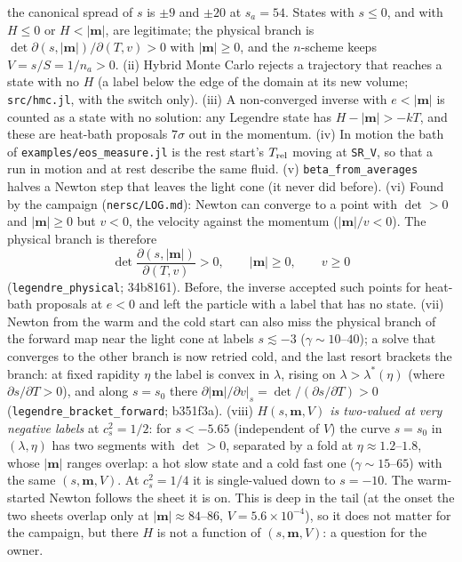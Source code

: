 \documentclass[11pt,aps,preprint,nofootinbib,superscriptaddress,tightenlines]{revtex4-2}
\def\st{\begin{equation}}
\def\stp{\end{equation}}
\begin{document}
\begin{itemize}
  the canonical spread of $s$ is $\pm9$ and $\pm20$ at $s_a=54$.  States with $s\le0$, and with $H\le0$ or $H<|\bm m|$, are legitimate; the physical branch is
  $\det\partial(s,|\bm m|)/\partial(T,v)>0$ with $|\bm m|\ge0$, and the $n$-scheme keeps $V=s/S=1/n_a>0$.  (ii) Hybrid Monte Carlo rejects a trajectory that
  reaches a state with no $H$ (a label below the edge of the domain at its new volume; \nolinkurl{src/hmc.jl}, with the switch only).  (iii) A non-converged
  inverse with $e<|\bm m|$ is counted as a state with no solution: any Legendre state has $H-|\bm m|>-kT$, and these are heat-bath proposals $7\sigma$ out in
  the momentum.  (iv) In motion the bath of \nolinkurl{examples/eos_measure.jl} is the rest start's $T_{\rm rel}$ moving at \texttt{SR\_V}, so that a run in motion
  and at rest describe the same fluid.  (v) \texttt{beta\_from\_averages} halves a Newton step that leaves the light cone (it never did before).
  (vi) Found by the campaign (\nolinkurl{nersc/LOG.md}): Newton can converge to a point with $\det>0$ and $|\bm m|\ge0$ but $v<0$, the velocity against
  the momentum ($|\bm m|/v<0$).  The physical branch is therefore
  \st
  \det\frac{\partial(s,|\bm m|)}{\partial(T,v)}>0,\qquad |\bm m|\ge0,\qquad v\ge0
  \stp
  (\texttt{legendre\_physical}; 34b8161).  Before, the inverse accepted such points for heat-bath proposals at $e<0$ and left the particle with a label
  that has no state.  (vii) Newton from the warm and the cold start can also miss the physical branch of the forward map near the light cone at
  labels $s\lesssim-3$ ($\gamma\sim10$--$40$); a solve that converges to the other branch is now retried cold, and the last resort brackets the
  branch: at fixed rapidity $\eta$ the label is convex in $\lambda$, rising on $\lambda>\lambda^*(\eta)$ (where $\partial s/\partial T>0$), and along
  $s=s_0$ there $\partial|\bm m|/\partial v|_s=\det/(\partial s/\partial T)>0$ (\texttt{legendre\_bracket\_forward}; b351f3a).
  (viii) \emph{$H(s,\bm m,V)$ is two-valued at very negative labels} at $c_s^2=1/2$: for $s<-5.65$ (independent of $V$) the curve $s=s_0$ in
  $(\lambda,\eta)$ has two segments with $\det>0$, separated by a fold at $\eta\approx1.2$--$1.8$, whose $|\bm m|$ ranges overlap: a hot slow state and a
  cold fast one ($\gamma\sim15$--$65$) with the same $(s,\bm m,V)$.  At $c_s^2=1/4$ it is single-valued down to $s=-10$.  The warm-started Newton
  follows the sheet it is on.  This is deep in the tail (at the onset the two sheets overlap only at $|\bm m|\approx84$--$86$, $V=5.6\times10^{-4}$), so it does not matter for the campaign, but there $H$ is not a function of $(s,\bm m,V)$: a question for the owner.
\end{itemize}
\end{document}
